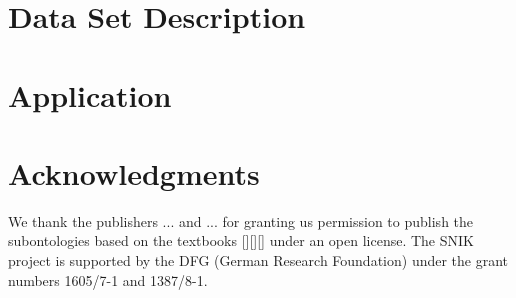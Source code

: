 \documentclass[sw]{iosart2x}
\begin{document}
\section{Data Set Description}

\section{Application}

\section{Acknowledgments}
We thank the publishers ... and ... for granting us permission to publish the subontologies based on the textbooks [][][] under an open license.
The SNIK project is supported by the DFG (German Research Foundation) under the grant numbers 1605/7-1 and 1387/8-1.
\nocite{*} 


\end{document}
